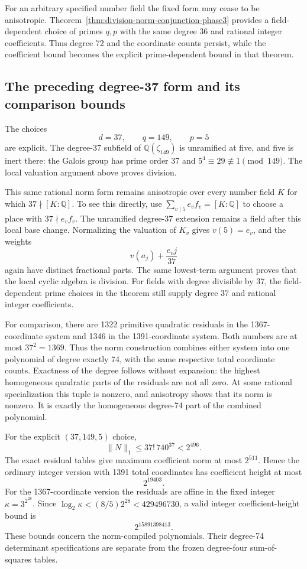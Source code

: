 For an arbitrary specified number field the fixed form may
cease to be anisotropic.  Theorem~\ref{thm:division-norm-conjunction-phase3}
provides a field-dependent choice of primes $q,p$ with the
same degree 36 and rational integer coefficients.  Thus
degree 72 and the coordinate counts persist, while the
coefficient bound becomes the explicit prime-dependent bound
in that theorem.

\subsection{The preceding degree-37 form and its comparison bounds}

The choices
\[
                         d=37,\qquad q=149,\qquad p=5
\]
are explicit.  The degree-37 subfield of $\mathbb Q(\zeta_{149})$
is unramified at five, and five is inert there: the Galois group
has prime order 37 and $5^4\equiv29\not\equiv1\pmod{149}$.
The local valuation argument above proves division.

This same rational norm form remains anisotropic over every
number field $K$ for which $37\nmid[K:\mathbb Q]$.  To see
this directly, use
$\sum_{v\mid5}e_vf_v=[K:\mathbb Q]$ to choose a place with
$37\nmid e_vf_v$.  The unramified degree-37 extension remains
a field after this local base change.  Normalizing the valuation
of $K_v$ gives $v(5)=e_v$, and the weights
\[
                       v(a_j)+\frac{e_vj}{37}
\]
again have distinct fractional parts.  The same lowest-term
argument proves that the local cyclic algebra is division.
For fields with degree divisible by 37, the field-dependent
prime choices in the theorem still supply degree 37 and rational
integer coefficients.

For comparison, there are 1322 primitive quadratic residuals in the
1367-coordinate system and 1346 in the 1391-coordinate system.
Both numbers are at most $37^2=1369$.  Thus the norm construction
combines either system into one polynomial of degree exactly 74,
with the same respective total coordinate counts.  Exactness of
the degree follows without expansion: the highest homogeneous
quadratic parts of the residuals are not all zero.  At some
rational specialization this tuple is nonzero, and anisotropy
shows that its norm is nonzero.  It is exactly the homogeneous
degree-74 part of the combined polynomial.

For the explicit $(37,149,5)$ choice,
\[
               \|N\|_1\le37!\,740^{37}<2^{496}.
\]
The exact residual tables give maximum coefficient norm at most
$2^{511}$.  Hence the ordinary integer version with 1391 total
coordinates has coefficient height at most
\[
                              2^{19403}.
\]
For the 1367-coordinate version the residuals are affine in
the fixed integer $\kappa=3^{2^{28}}$.  Since
$\log_2\kappa<(8/5)2^{28}<429496730$, a valid integer
coefficient-height bound is
\[
                              2^{15891398413}.
\]
These bounds concern the norm-compiled polynomials.  Their
degree-74 determinant specifications are separate from the
frozen degree-four sum-of-squares tables.

